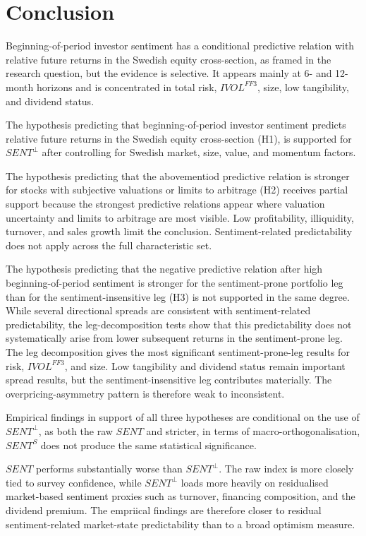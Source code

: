 \documentclass[11pt]{article}
\newcommand{\var}[1]{\ensuremath{#1}}
\begin{document}
\section{Conclusion}
Beginning-of-period investor sentiment has a conditional predictive relation with relative future returns in the Swedish equity cross-section, as framed in the research question, but the evidence is selective. It appears mainly at 6- and 12-month horizons and is concentrated in total risk, \var{IVOL^{FF3}}, size, low tangibility, and dividend status.

The hypothesis predicting that beginning-of-period investor sentiment predicts relative future returns in the Swedish equity cross-section (H1), is supported for \var{SENT^{\perp}} after controlling for Swedish market, size, value, and momentum factors.

The hypothesis predicting that the abovementiod predictive relation is stronger for stocks with subjective valuations or limits to arbitrage (H2) receives partial support because the strongest predictive relations appear where valuation uncertainty and limits to arbitrage are most visible. Low profitability, illiquidity, turnover, and sales growth limit the conclusion. Sentiment-related predictability does not apply across the full characteristic set.

The hypothesis predicting that the negative predictive relation after high beginning-of-period sentiment is stronger for the sentiment-prone portfolio leg than for the sentiment-insensitive leg (H3) is not supported in the same degree. While several directional spreads are consistent with sentiment-related predictability, the leg-decomposition tests show that this predictability does not systematically arise from lower subsequent returns in the sentiment-prone leg. The leg decomposition gives the most significant sentiment-prone-leg results for risk, \var{IVOL^{FF3}}, and size. Low tangibility and dividend status remain important spread results, but the sentiment-insensitive leg contributes materially. The overpricing-asymmetry pattern is therefore weak to inconsistent.

Empirical findings in support of all three hypotheses are conditional on the use of \var{SENT^{\perp}}, as both the raw \var{SENT} and stricter, in terms of macro-orthogonalisation, \var{SENT^{S}} does not produce the same statistical significance.

\var{SENT} performs substantially worse than \var{SENT^{\perp}}. The raw index is more closely tied to survey confidence, while \var{SENT^{\perp}} loads more heavily on residualised market-based sentiment proxies such as turnover, financing composition, and the dividend premium. The empriical findings are therefore closer to residual sentiment-related market-state predictability than to a broad optimism measure.
\end{document}

